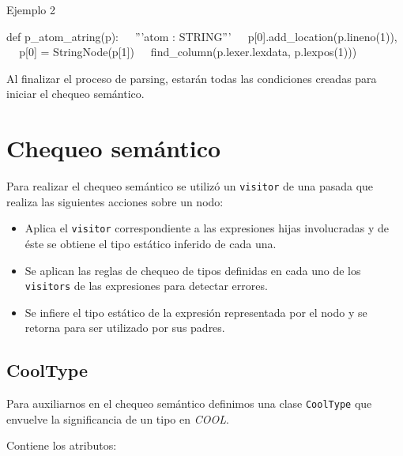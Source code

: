 \documentclass[a4paper,10pt,twocolumn]{article}
\begin{document}
\begin{algorithm}
	\caption{Ejemplo 2}
	\begin{algorithmic}
		\STATE def p\_atom\_atring(p):
		\STATE $\;\;\; $ '''atom : STRING'''
		\STATE $\;\;\; $ p[0].add\_location(p.lineno(1)),
		\STATE $\;\;\; $ p[0] = StringNode(p[1])
		\STATE $\;\;\; $ find\_column(p.lexer.lexdata, p.lexpos(1)))
	\end{algorithmic}
\end{algorithm}

Al finalizar el proceso de parsing, estarán todas las condiciones creadas para iniciar el chequeo semántico.

\section{Chequeo semántico}

Para realizar el chequeo semántico se utilizó un \lstinline|visitor| de una pasada que realiza las siguientes acciones sobre un nodo:

\begin{itemize}
	\item Aplica el \lstinline|visitor| correspondiente a las expresiones hijas involucradas y de éste se obtiene el tipo estático inferido de cada una. 
	\item Se aplican las reglas de chequeo de tipos definidas en cada uno de los \lstinline|visitors| de las expresiones para detectar errores. 
	\item Se infiere el tipo estático de la expresión representada por el nodo y se retorna para ser utilizado por sus padres. 
\end{itemize}

\subsection{CoolType}
Para auxiliarnos en el chequeo semántico definimos una clase \lstinline|CoolType| que envuelve la significancia de un tipo en \textit{COOL}. 

Contiene los atributos:
\end{document}
